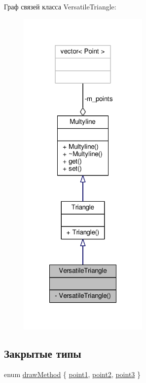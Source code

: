 Граф связей класса Versatile\-Triangle\-:
\nopagebreak
\begin{figure}[H]
\begin{center}
\leavevmode
\includegraphics[width=180pt]{class_versatile_triangle__coll__graph}
\end{center}
\end{figure}
\subsection*{Закрытые типы}
\begin{DoxyCompactItemize}
\item 
enum \hyperlink{class_versatile_triangle_ac4d324c8cbe82814fe769899adfc8678}{draw\-Method} \{ \hyperlink{class_versatile_triangle_ac4d324c8cbe82814fe769899adfc8678ab3b58d2ea402d320ea64301bc1af59e3}{point1}, 
\hyperlink{class_versatile_triangle_ac4d324c8cbe82814fe769899adfc8678abf098998afad6663f3e41cba9cbca69e}{point2}, 
\hyperlink{class_versatile_triangle_ac4d324c8cbe82814fe769899adfc8678ad47b6fee6cca0e5c5a42d2baf3a81e2b}{point3}
 \}
\end{DoxyCompactItemize}
